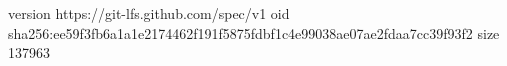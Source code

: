 version https://git-lfs.github.com/spec/v1
oid sha256:ee59f3fb6a1a1e2174462f191f5875fdbf1c4e99038ae07ae2fdaa7cc39f93f2
size 137963

